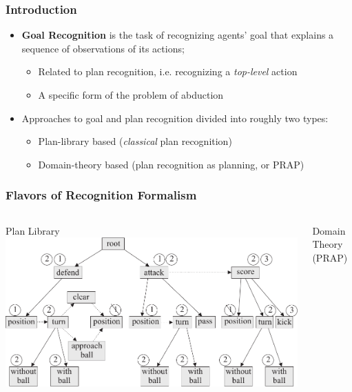 \documentclass{beamer}
\begin{document}
	\begin{frame}[c]\frametitle{Introduction}
		\begin{itemize}
			\item \textbf{Goal Recognition} is the task of recognizing agents' goal that explains a sequence of observations of its actions;
			\begin{itemize}
				\item Related to plan recognition, i.e. recognizing a \emph{top-level} action
				\item A specific form of the problem of abduction 
			\end{itemize}
			\item Approaches to goal and plan recognition divided into roughly two types:
			\begin{itemize}
				\item Plan-library based (\emph{classical} plan recognition)
				\item Domain-theory based (plan recognition as planning, or PRAP)
			\end{itemize}
		\end{itemize}
	\end{frame}
	
	\begin{frame}[c]\frametitle{Flavors of Recognition Formalism}
		\begin{columns}
			\begin{column}[t]{0.5\textwidth}
				Plan Library
				\includegraphics[width=\textwidth]{examples/fig_plan_library.pdf}
			\end{column}
			\begin{column}[t]{0.5\textwidth}
				Domain Theory (PRAP)
				
			\end{column}
		\end{columns}
	\end{frame}
	
\end{document}
